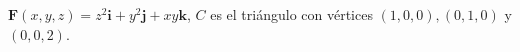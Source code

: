 \item $\mathbf{F}(x, y, z) = z^2 \mathbf{i} + y^2 \mathbf{j} + xy \mathbf{k}$, $C$ es el triángulo con vértices $(1, 0, 0), (0, 1, 0)$ y $(0, 0, 2)$.
